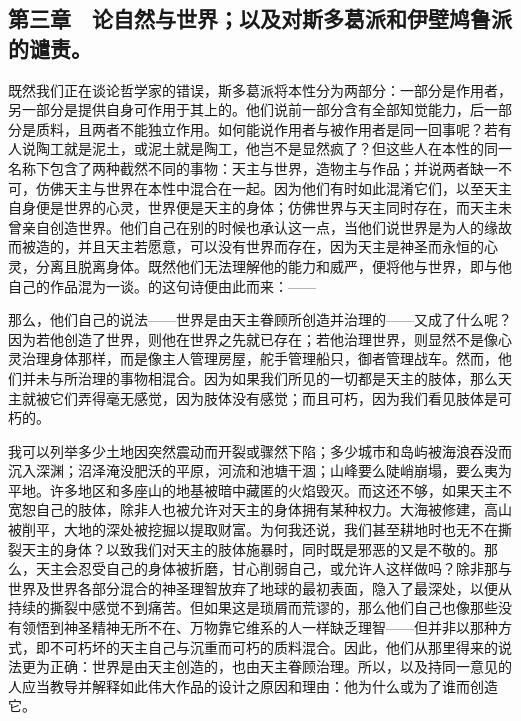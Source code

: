 
\subsection{第三章　论自然与世界；以及对斯多葛派和伊壁鸠鲁派的谴责。}

既然我们正在谈论哲学家的错误，斯多葛派将本性分为两部分：一部分是作用者，另一部分是提供自身可作用于其上的。他们说前一部分含有全部知觉能力，后一部分是质料，且两者不能独立作用。如何能说作用者与被作用者是同一回事呢？若有人说陶工就是泥土，或泥土就是陶工，他岂不是显然疯了？但这些人在本性的同一名称下包含了两种截然不同的事物：天主与世界，造物主与作品；并说两者缺一不可，仿佛天主与世界在本性中混合在一起。因为他们有时如此混淆它们，以至天主自身便是世界的心灵，世界便是天主的身体；仿佛世界与天主同时存在，而天主未曾亲自创造世界。他们自己在别的时候也承认这一点，当他们说世界是为人的缘故而被造的，并且天主若愿意，可以没有世界而存在，因为天主是神圣而永恒的心灵，分离且脱离身体。既然他们无法理解他的能力和威严，便将他与世界，即与他自己的作品混为一谈。的这句诗便由此而来：——\par

\par

那么，他们自己的说法——世界是由天主眷顾所创造并治理的——又成了什么呢？因为若他创造了世界，则他在世界之先就已存在；若他治理世界，则显然不是像心灵治理身体那样，而是像主人管理房屋，舵手管理船只，御者管理战车。然而，他们并未与所治理的事物相混合。因为如果我们所见的一切都是天主的肢体，那么天主就被它们弄得毫无感觉，因为肢体没有感觉；而且可朽，因为我们看见肢体是可朽的。\par

我可以列举多少土地因突然震动而开裂或骤然下陷；多少城市和岛屿被海浪吞没而沉入深渊；沼泽淹没肥沃的平原，河流和池塘干涸；山峰要么陡峭崩塌，要么夷为平地。许多地区和多座山的地基被暗中藏匿的火焰毁灭。而这还不够，如果天主不宽恕自己的肢体，除非人也被允许对天主的身体拥有某种权力。大海被修建，高山被削平，大地的深处被挖掘以提取财富。为何我还说，我们甚至耕地时也无不在撕裂天主的身体？以致我们对天主的肢体施暴时，同时既是邪恶的又是不敬的。那么，天主会忍受自己的身体被折磨，甘心削弱自己，或允许人这样做吗？除非那与世界及世界各部分混合的神圣理智放弃了地球的最初表面，隐入了最深处，以便从持续的撕裂中感觉不到痛苦。但如果这是琐屑而荒谬的，那么他们自己也像那些没有领悟到神圣精神无所不在、万物靠它维系的人一样缺乏理智——但并非以那种方式，即不可朽坏的天主自己与沉重而可朽的质料混合。因此，他们从那里得来的说法更为正确：世界是由天主创造的，也由天主眷顾治理。所以，以及持同一意见的人应当教导并解释如此伟大作品的设计之原因和理由：他为什么或为了谁而创造它。\par

